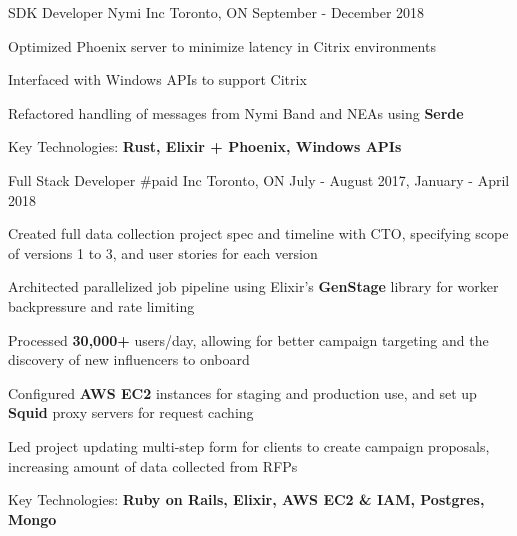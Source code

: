 

\begin{cventries}

  \cventry
    {SDK Developer} %
    {Nymi Inc} %
    {Toronto, ON} %
    {September - December 2018} %
    {
      \begin{cvitems} %
        \item {Optimized Phoenix server to minimize latency in Citrix environments}
        \item {Interfaced with Windows APIs to support Citrix}
        \item {Refactored handling of messages from Nymi Band and NEAs using \textbf{Serde}}
        \item {Key Technologies: \textbf{Rust, Elixir + Phoenix, Windows APIs}}
      \end{cvitems}
    }

  \cventry
    {Full Stack Developer} %
    {\#paid Inc} %
    {Toronto, ON} %
    {July - August 2017, January - April 2018} %
    {
      \begin{cvitems} %
        \item {Created full data collection project spec and timeline with CTO, specifying scope of versions 1 to 3, and user stories for each version}
        \item {Architected parallelized job pipeline using Elixir's \textbf{GenStage} library for worker backpressure and rate limiting}
        \item {Processed \textbf{30,000+} users/day, allowing for better campaign targeting and the discovery of new influencers to onboard}
        \item {Configured \textbf{AWS EC2} instances for staging and production use, and set up \textbf{Squid} proxy servers for request caching}
        \item {Led project updating multi-step form for clients to create campaign proposals, increasing amount of data collected from RFPs}
        \item {Key Technologies: \textbf{Ruby on Rails, Elixir, AWS EC2 \& IAM, Postgres, Mongo}}
      \end{cvitems}
    }

\end{cventries}
